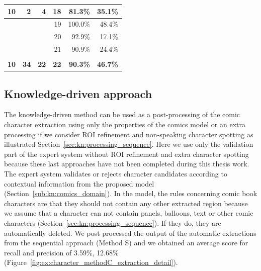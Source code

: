 \begin{table}[h]
\begin{tabular}{|c|l|l|r|r|r|}
\multicolumn{1}{|r|}{10} & \multicolumn{1}{r|}{2} & \multicolumn{1}{r|}{4} & 18 & 81.3\% & 35.1\% \\ \hline
 &   &  & 19 & 100.0\% & 48.4\% \\ \hline
 &   &  & 20 & 92.9\% & 17.1\% \\ \hline
 &   &  & 21 & 90.9\% & 24.4\% \\ \hline
 &  &  &  & &  \\ \hline %
\multicolumn{1}{|r|}{\textbf{10}} & \multicolumn{1}{r|}{\textbf{34}} & \multicolumn{1}{r|}{\textbf{22}} & \multicolumn{1}{r|}{\textbf{22}} & \textbf{90.3\%} & \textbf{46.7\%} \\ \hline
\end{tabular}
\label{tab:ex:character_spotting_detail_result}
\end{table}



\subsection{Knowledge-driven approach} %

The knowledge-driven method can be used as a post-processing of the comic character extraction using only the properties of the comics model or an extra processing if we consider ROI refinement and non-speaking character spotting as illustrated Section~\ref{sec:kn:processing_sequence}.
Here we use only the validation part of the expert system without ROI refinement and extra character spotting because these last approaches have not been completed during this thesis work.
The expert system validates or rejects character candidates according to contextual information from the proposed model (Section~\ref{sub:kn:comics_domain}).
In the model, the rules concerning comic book characters are that they should not contain any other extracted region because we assume that a character can not contain panels, balloons, text or other comic characters (Section~\ref{sec:kn:processing_sequence}).
If they do, they are automatically deleted.
We post processed the output of the automatic extractions from the sequential approach (Method S) and we obtained an average score for recall and precision of 3.59\%, 12.68\% (Figure~\ref{fig:ex:character_methodC_extraction_detail}).

